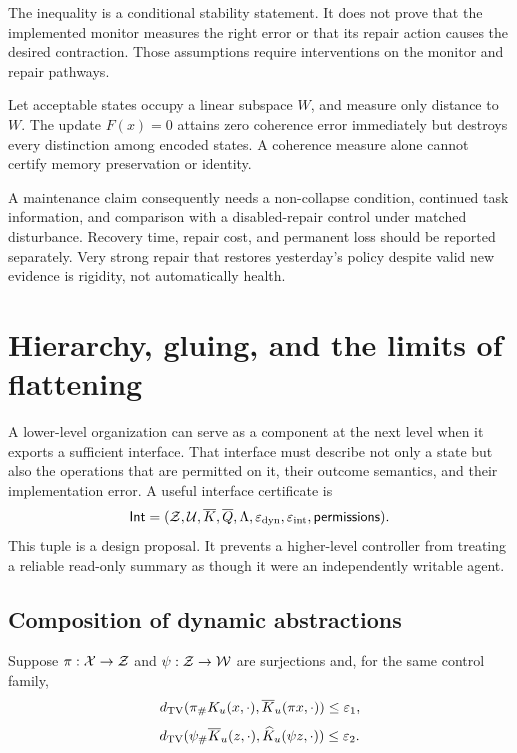 The inequality is a conditional stability statement. It does not prove that the implemented monitor measures the right error or that its repair action causes the desired contraction. Those assumptions require interventions on the monitor and repair pathways.

\begin{MScounterexample}\label{MS:ex:zerocollapse}
Let acceptable states occupy a linear subspace $W$, and measure only distance to $W$. The update $F(x)=0$ attains zero coherence error immediately but destroys every distinction among encoded states. A coherence measure alone cannot certify memory preservation or identity.
\end{MScounterexample}

A maintenance claim consequently needs a non-collapse condition, continued task information, and comparison with a disabled-repair control under matched disturbance. Recovery time, repair cost, and permanent loss should be reported separately. Very strong repair that restores yesterday's policy despite valid new evidence is rigidity, not automatically health.

\section{Hierarchy, gluing, and the limits of flattening}\label{MS:sec:hierarchy}
A lower-level organization can serve as a component at the next level when it exports a sufficient interface. That interface must describe not only a state but also the operations that are permitted on it, their outcome semantics, and their implementation error. A useful interface certificate is
\[
\mathsf{Int}=(\mathcal Z,\mathcal U,\overline K,\overline Q,\Lambda,
\varepsilon_{\rm dyn},\varepsilon_{\rm int},\mathsf{permissions}).
\]
This tuple is a design proposal. It prevents a higher-level controller from treating a reliable read-only summary as though it were an independently writable agent.

\subsection{Composition of dynamic abstractions}
Suppose $\pi:\mathcal X\to\mathcal Z$ and $\psi:\mathcal Z\to\mathcal W$ are surjections and, for the same control family,
\[
d_{\mathrm{TV}}(\pi_{\#} K_u(x,\cdot),\overline K_u(\pi x,\cdot))\leq\varepsilon_1,
\]
\[
d_{\mathrm{TV}}(\psi_{\#}\overline K_u(z,\cdot),\widehat K_u(\psi z,\cdot))\leq\varepsilon_2.
\]

